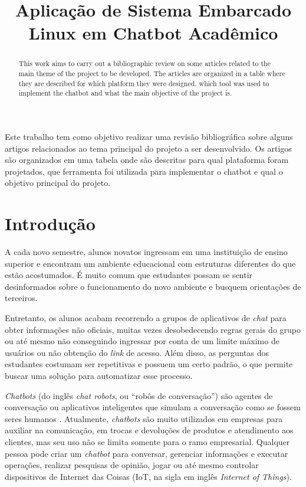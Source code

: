 \documentclass[12pt]{article}
\title{Aplicação de Sistema Embarcado Linux em Chatbot Acadêmico}
\begin{document}
 

\maketitle

\begin{abstract}
This work aims to carry out a bibliographic review on some articles related to the main theme of the project to be developed. The articles are organized in a table where they are described for which platform they were designed, which tool was used to implement the chatbot and what the main objective of the project is.
\end{abstract}
     
\begin{resumo} 
Este trabalho tem como objetivo realizar uma revisão bibliográfica sobre alguns artigos relacionados ao tema principal do projeto a ser desenvolvido. Os artigos são organizados em uma tabela onde são descritas para qual plataforma foram projetados, que ferramenta foi utilizada para implementar o chatbot e qual o objetivo principal do projeto.
\end{resumo}


\section{Introdução}

A cada novo semestre, alunos novatos ingressam em uma instituição de ensino superior e encontram um ambiente educacional com estruturas diferentes do que estão acostumados. É muito comum que estudantes possam se sentir desinformados sobre o funcionamento do novo ambiente e busquem orientações de terceiros. 

Entretanto, os alunos acabam recorrendo a grupos de aplicativos de {\itshape chat} para obter informações não oficiais, muitas vezes desobedecendo regras gerais do grupo ou até mesmo não conseguindo ingressar por conta de um limite máximo de usuários ou não obtenção do {\itshape link} de acesso. Além disso, as perguntas dos estudantes costumam ser repetitivas e possuem um certo padrão, o que permite buscar uma solução para automatizar esse processo.

{\itshape Chatbots} (do inglês {\itshape chat robots}, ou “robôs de conversação”) são agentes de conversação ou aplicativos inteligentes que simulam a conversação como se fossem seres humanos \cite{lucchesi:18}. Atualmente, {\itshape chatbots} são muito utilizados em empresas para auxiliar na comunicação, em trocas e devoluções de produtos e atendimento aos clientes, mas seu uso não se limita somente para o ramo empresarial. Qualquer pessoa pode criar um {\itshape chatbot} para conversar, gerenciar informações e executar operações, realizar pesquisas de opinião, jogar ou até mesmo controlar dispositivos de Internet das Coisas (IoT, na sigla em inglês {\itshape Internet of Things}).
\end{document}
